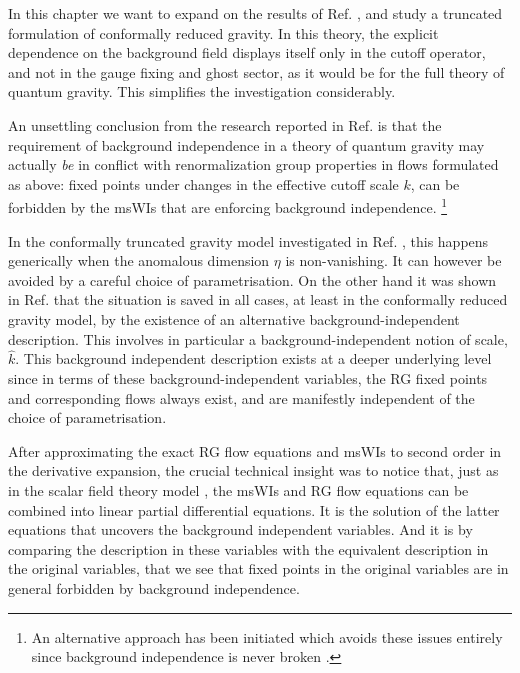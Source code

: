 \documentclass[11pt]{book}
\numberwithin{equation}{chapter}
\begin{document}
In this chapter we want to expand on the results of Ref. \cite{Dietz:2015owa}, and study
a truncated formulation of conformally reduced gravity. In this theory, the explicit dependence
on the background field displays itself only in the cutoff operator, and not in the gauge
fixing and ghost sector, as it would be for the full theory of quantum gravity.
This simplifies the investigation considerably.

An unsettling conclusion from the research reported in Ref. \cite{Dietz:2015owa} is that the
requirement of background independence in a theory of quantum gravity may actually \textit{be}
in conflict with renormalization group properties in flows formulated as above:
fixed points under changes in the effective cutoff scale $k$, can be forbidden by the msWIs
that are enforcing background independence.%
\footnote{An alternative approach has been initiated which avoids
these issues entirely since background independence is never broken \cite{Morris:2016nda}.}

In the conformally truncated gravity model investigated in Ref. \cite{Dietz:2015owa},
this happens generically when the anomalous dimension $\eta$ is non-vanishing.
It can however be avoided by a careful choice of parametrisation.
On the other hand it was shown in Ref. \cite{Dietz:2015owa} that the situation is saved in all cases,
at least in the conformally reduced gravity model,
by the existence of an alternative background-independent description.
This involves in particular a background-independent notion of scale, $\hat{k}$.
This background independent description exists at a deeper underlying level since in terms
of these background-independent variables, the RG fixed points and corresponding flows always exist,
and are manifestly independent of the choice of parametrisation.

After approximating the exact RG flow equations and msWIs to second order in the derivative expansion,
the crucial technical insight was to notice that, just as in the scalar field theory model
\cite{Bridle:2013sra}, the msWIs and RG flow equations can be combined into linear partial
differential equations.
It is the solution of the latter equations that uncovers the background independent variables.
And it is by comparing the description in these variables with the equivalent description
in the original variables, that we see that fixed points in the original variables are
in general forbidden by background independence.
\end{document}
